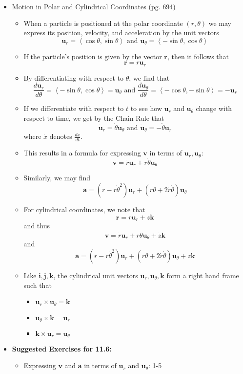 \documentclass[12pt]{article}
\renewcommand{\vec}[1]{\mathbf{#1}}
\newcommand{\veci}{\mathbf{i}}
\newcommand{\vecj}{\mathbf{j}}
\newcommand{\veck}{\mathbf{k}}
\newcommand{\<}{\left<}
\renewcommand{\>}{\right>}
\begin{document}
\begin{itemize}
  \item Motion in Polar and Cylindrical Coordinates (pg. 694)
  
    \begin{itemize}
    \item When a particle is positioned at the polar coordinate $(r,\theta)$ we may express its position, velocity, and acceleration by the unit vectors \[\vec{u}_r = \<\cos\theta,\sin\theta\> \text{ and } \vec{u}_\theta = \<-\sin\theta,\cos\theta\>\]
    \item If the particle's position is given by the vector $\vec{r}$, then it follows that \[\vec{r} = r\vec{u}_r\]
    \item By differentiating with respect to $\theta$, we find that \[\frac{d\vec{u}_r}{d\theta} = \<-\sin\theta,\cos\theta\> = \vec{u}_\theta \text{ and } \frac{d\vec{u}_\theta}{d\theta} = \<-\cos\theta,-\sin\theta\> = -\vec{u}_r\]
    \item If we differentiate with respect to $t$ to see how $\vec{u}_r$ and $\vec{u}_\theta$ change with respect to time, we get by the Chain Rule that \[\dot{\vec{u}}_r = \dot{\theta}\vec{u}_\theta \text{ and } \dot{\vec{u}}_\theta = -\dot\theta\vec{u}_r\] where $\dot x$ denotes $\frac{dx}{dt}$.
    \item This results in a formula for expressing $\vec{v}$ in terms of $\vec{u}_r,\vec{u}_\theta$: \[\vec{v} = \dot{r}\vec{u}_r + r\dot\theta\vec{u}_\theta\]
    \item Similarly, we may find \[\vec{a} = (\ddot{r} - r\dot\theta^2)\vec{u}_r + (r\ddot\theta + 2\dot{r}\dot\theta)\vec{u}_\theta\]
    \item For cylindrical coordinates, we note that \[\vec{r} = r\vec{u}_r + z\veck\] and thus \[\vec{v} = \dot{r}\vec{u}_r + r\dot\theta\vec{u}_\theta + \dot{z}\veck\] and \[\vec{a} = (\ddot{r} - r\dot\theta^2)\vec{u}_r + (r\ddot\theta + 2\dot{r}\dot\theta)\vec{u}_\theta+\ddot{z}\veck\]
    \item Like $\veci,\vecj,\veck$, the cylindrical unit vectors $\vec{u}_r,\vec{u}_\theta,\veck$ form a right hand frame such that
      \begin{itemize}
      \item $\vec{u}_r \times \vec{u}_\theta = \veck$
      \item $\vec{u}_\theta \times \veck = \vec{u}_r$
      \item $\veck \times \vec{u}_r = \vec{u}_\theta$
      \end{itemize}
    \end{itemize}
  
  \item \textbf{ Suggested Exercises for 11.6:}
  
    \begin{itemize}
    \item Expressing $\vec{v}$ and $\vec{a}$ in terms of $\vec{u}_r$ and $\vec{u}_\theta$: 1-5
    \end{itemize}
  \end{itemize}
  
\end{document}

